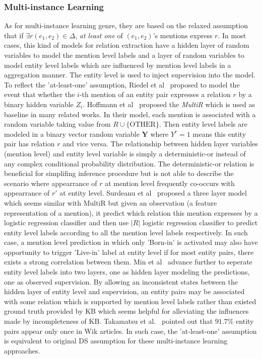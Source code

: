\documentclass[10pt]{article} %
\theoremstyle{definition}
\theoremstyle{definition}
\begin{document}
\subsubsection{Multi-instance Learning}
As for multi-instance learning genre, they are based on the relaxed assumption that if $\exists r(e_1, e_2)\in\Delta$, \emph{at least one} of $(e_1, e_2)$'s mentions express $r$. 
In most cases, this kind of models for relation extraction have a hidden layer of random variables to model the mention level labels 
and a layer of random variables to model entity level labels which are influenced by mention level labels in a aggregation manner. 
The entity level is used to inject supervision into the model. 
To reflect the 'at-least-one' assumption, Riedel et al~\cite{riedel} proposed to model the event that whether the $i$-th mention of an entity pair expresses a relation $r$ by a binary hidden variable $Z_i$. 
Hoffmann et al~\cite{hoffmann} proposed the \emph{MultiR} which is used as baseline in many related works. 
In their model, each mention is associated with a random variable taking value from $R\cup\{\text{OTHER}\}$. 
Then entity level labels are modeled in a binary vector random variable $\mathbf{Y}$ where $Y^{r}=1$ means this entity pair has relation $r$ and vice versa. 
The relationship between hidden layer variables (mention level) and entity level variable is simply a deterministic-or instead of any complex conditional probability distribution. 
The deterministic-or relation is beneficial for simplifing inference procedure but is not able to describe the scenario where appearrance of $r$ at mention level frequently co-occurs with appearrance of $r'$ at entity level. 
Surdeanu et al~\cite{surdeanu} proposed a three layer model which seems similar with MultiR but given an observation (a feature representation of a mention), it predict which relation this mention expresses by a logistic regression classifier and then use $\vert R\vert$ logistic regression classifier to predict entity level labels according to all the mention level labels respectively. 
In such case, a mention level prediction in which only 'Born-in' is activated may also have opportunity to trigger 'Live-in' label at entity level if for most entity pairs, there exists a strong correlation between them. 
Min et al~\cite{4layers} advance further to seperate entity level labels into two layers, one as hidden layer modeling the predictions, one as observed supervision. 
By allowing an inconsistent states between the hidden layer of entity level and supervision, an entity pairs may be associated with some relation which is supported by mention level labels rather than existed ground truth provided by KB which seems helpful for alleviating the influences made by incompleteness of KB. 
Takamatsu et al.~\cite{takamatsu} pointed out that $91.7\%$ entity pairs appear only once in Wik articles. 
In such case, the 'at-least-one' assumption is equivalent to original DS assumption for these multi-instance learning approaches. 
\end{document}
